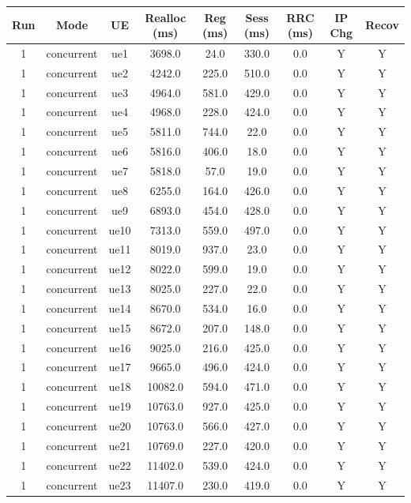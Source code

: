 \begin{table}[ht]
\centering
\begin{tabular}{|c|c|c|c|c|c|c|c|c|}
\hline
Run & Mode & UE & Realloc (ms) & Reg (ms) & Sess (ms) & RRC (ms) & IP Chg & Recov \\
\hline
1 & concurrent & ue1 & 3698.0 & 24.0 & 330.0 & 0.0 & Y & Y \\
1 & concurrent & ue2 & 4242.0 & 225.0 & 510.0 & 0.0 & Y & Y \\
1 & concurrent & ue3 & 4964.0 & 581.0 & 429.0 & 0.0 & Y & Y \\
1 & concurrent & ue4 & 4968.0 & 228.0 & 424.0 & 0.0 & Y & Y \\
1 & concurrent & ue5 & 5811.0 & 744.0 & 22.0 & 0.0 & Y & Y \\
1 & concurrent & ue6 & 5816.0 & 406.0 & 18.0 & 0.0 & Y & Y \\
1 & concurrent & ue7 & 5818.0 & 57.0 & 19.0 & 0.0 & Y & Y \\
1 & concurrent & ue8 & 6255.0 & 164.0 & 426.0 & 0.0 & Y & Y \\
1 & concurrent & ue9 & 6893.0 & 454.0 & 428.0 & 0.0 & Y & Y \\
1 & concurrent & ue10 & 7313.0 & 559.0 & 497.0 & 0.0 & Y & Y \\
1 & concurrent & ue11 & 8019.0 & 937.0 & 23.0 & 0.0 & Y & Y \\
1 & concurrent & ue12 & 8022.0 & 599.0 & 19.0 & 0.0 & Y & Y \\
1 & concurrent & ue13 & 8025.0 & 227.0 & 22.0 & 0.0 & Y & Y \\
1 & concurrent & ue14 & 8670.0 & 534.0 & 16.0 & 0.0 & Y & Y \\
1 & concurrent & ue15 & 8672.0 & 207.0 & 148.0 & 0.0 & Y & Y \\
1 & concurrent & ue16 & 9025.0 & 216.0 & 425.0 & 0.0 & Y & Y \\
1 & concurrent & ue17 & 9665.0 & 496.0 & 424.0 & 0.0 & Y & Y \\
1 & concurrent & ue18 & 10082.0 & 594.0 & 471.0 & 0.0 & Y & Y \\
1 & concurrent & ue19 & 10763.0 & 927.0 & 425.0 & 0.0 & Y & Y \\
1 & concurrent & ue20 & 10763.0 & 566.0 & 427.0 & 0.0 & Y & Y \\
1 & concurrent & ue21 & 10769.0 & 227.0 & 420.0 & 0.0 & Y & Y \\
1 & concurrent & ue22 & 11402.0 & 539.0 & 424.0 & 0.0 & Y & Y \\
1 & concurrent & ue23 & 11407.0 & 230.0 & 419.0 & 0.0 & Y & Y \\

\end{tabular}
\end{table}
